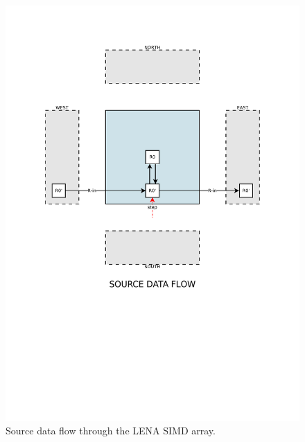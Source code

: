 \begin{figure}[h]
  \centering
  \includegraphics[width=\linewidth,clip,trim=0 0 0 0]
                  {fig/fpga/fpga-simd-s-reg.pdf}
  \caption[Source Data Flow.]{Source data flow through the \ac{LENA} \ac{SIMD} array.}
  \label{fig:fpga-simd-s-reg}
\end{figure}
